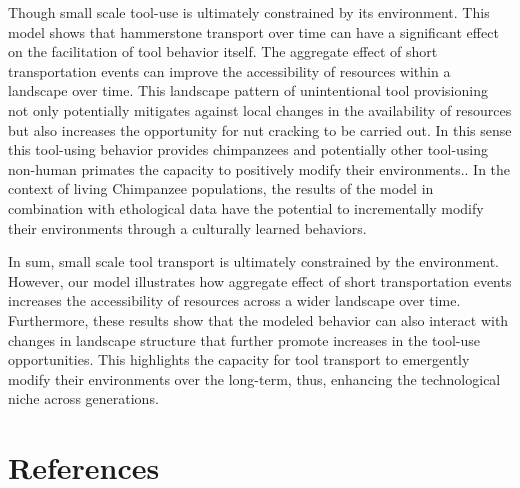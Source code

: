 \documentclass[9pt,twocolumn,twoside,]{pnas-new}
\begin{document}
Though small scale tool-use is ultimately constrained by its
environment. This model shows that hammerstone transport over time can
have a significant effect on the facilitation of tool behavior itself.
The aggregate effect of short transportation events can improve the
accessibility of resources within a landscape over time. This landscape
pattern of unintentional tool provisioning not only potentially
mitigates against local changes in the availability of resources but
also increases the opportunity for nut cracking to be carried out. In
this sense this tool-using behavior provides chimpanzees and potentially
other tool-using non-human primates the capacity to positively modify
their environments.. In the context of living Chimpanzee populations,
the results of the model in combination with ethological data have the
potential to incrementally modify their environments through a
culturally learned behaviors.

In sum, small scale tool transport is ultimately constrained by the
environment. However, our model illustrates how aggregate effect of
short transportation events increases the accessibility of resources
across a wider landscape over time. Furthermore, these results show that
the modeled behavior can also interact with changes in landscape
structure that further promote increases in the tool-use opportunities.
This highlights the capacity for tool transport to emergently modify
their environments over the long-term, thus, enhancing the technological
niche across generations.

\showmatmethods
\showacknow
\pnasbreak

\hypertarget{references}{%
\section*{References}\label{references}}
\end{document}
